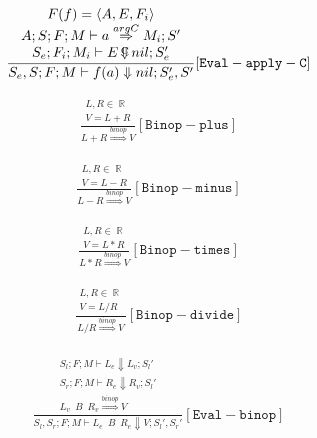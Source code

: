\documentclass{scrartcl}
\DeclareMathOperator{\numtype}{\mathbb{R}}
\DeclareMathOperator{\ceval}{\overset{C}{\smash{\Downarrow}}}
\begin{document}
    \begin{align*}
    \frac{
        \begin{matrix}
        F(f) = \left< A, E, F_i \right> \\
        A; S; F; M \vdash a \overset{argC}{\Rightarrow} M_i; S' \\
        S_e; F_i; M_i \vdash E \ceval nil; S_e'
        \end{matrix}
    }{
        S_e, S; F; M \vdash f(a) \Downarrow nil; S_e', S'
    }[\mathtt{Eval-apply-C}]
    \end{align*}
    
    \begin{align*}
    \frac{
        \begin{matrix}
        L, R \in \numtype \\
        V = L + R
        \end{matrix}
    }{
        L + R \overset{binop}{\Rightarrow} V
    }[\mathtt{Binop-plus}]
    \end{align*}
    
    \begin{align*}
    \frac{
        \begin{matrix}
        L, R \in \numtype \\
        V = L - R
        \end{matrix}
    }{
        L - R \overset{binop}{\Rightarrow} V
    }[\mathtt{Binop-minus}]
    \end{align*}
    
    \begin{align*}
    \frac{
        \begin{matrix}
        L, R \in \numtype \\
        V = L * R
        \end{matrix}
    }{
        L * R \overset{binop}{\Rightarrow} V
    }[\mathtt{Binop-times}]
    \end{align*}
    
    \begin{align*}
    \frac{
        \begin{matrix}
        L, R \in \numtype \\
        V = L / R
        \end{matrix}
    }{
        L / R \overset{binop}{\Rightarrow} V
    }[\mathtt{Binop-divide}]
    \end{align*}
    
    \begin{align*}
    \frac{
        \begin{matrix}
        S_l; F; M \vdash L_e \Downarrow L_v; S_l' \\
        S_r; F; M \vdash R_e \Downarrow R_v; S_l' \\
        L_v \enspace B \enspace R_v \overset{binop}{\Rightarrow} V
        \end{matrix}
    }{
        S_l, S_r; F; M \vdash L_e \enspace B \enspace R_e \Downarrow V; S_l', S_r'
    }[\mathtt{Eval-binop}]
    \end{align*}
    
\end{document}
